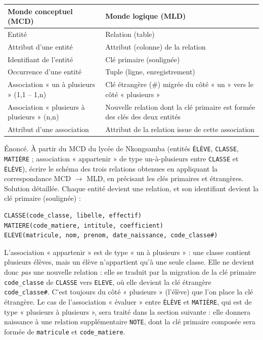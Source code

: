 \documentclass[11pt]{article}
\begin{document}
\begin{center}
\begin{tabularx}{\linewidth}{|X|X|}
\hline
\rowcolor{popblueL} \textbf{Monde conceptuel (MCD)} & \textbf{Monde logique (MLD)} \\
\hline
Entité & Relation (table) \\
\hline
Attribut d'une entité & Attribut (colonne) de la relation \\
\hline
Identifiant de l'entité & Clé primaire (soulignée) \\
\hline
Occurrence d'une entité & Tuple (ligne, enregistrement) \\
\hline
Association « un à plusieurs » (1,1 -- 1,n) & Clé étrangère (\#) migrée du côté « un » vers le côté « plusieurs » \\
\hline
Association « plusieurs à plusieurs » (n,n) & Nouvelle relation dont la clé primaire est formée des clés des deux entités \\
\hline
Attribut d'une association & Attribut de la relation issue de cette association \\
\hline
\end{tabularx}
\end{center}

\begin{exoresolu}
Énoncé. À partir du MCD du lycée de Nkongsamba (entités \texttt{ÉLÈVE}, \texttt{CLASSE}, \texttt{MATIÈRE} ; association « appartenir » de type un-à-plusieurs entre \texttt{CLASSE} et \texttt{ÉLÈVE}), écrire le schéma des trois relations obtenues en appliquant la correspondance MCD $\to$ MLD, en précisant les clés primaires et étrangères.
\tcblower
Solution détaillée. Chaque entité devient une relation, et son identifiant devient la clé primaire (soulignée) :
\begin{lstlisting}
CLASSE(code_classe, libelle, effectif)
MATIERE(code_matiere, intitule, coefficient)
ELEVE(matricule, nom, prenom, date_naissance, code_classe#)
\end{lstlisting}
L'association « appartenir » est de type « un à plusieurs » : une classe contient plusieurs élèves, mais un élève n'appartient qu'à une seule classe. Elle ne devient donc \emph{pas} une nouvelle relation : elle se traduit par la migration de la clé primaire \texttt{code\_classe} de \texttt{CLASSE} vers \texttt{ELEVE}, où elle devient la clé étrangère \texttt{code\_classe\#}. C'est toujours du côté « plusieurs » (l'élève) que l'on place la clé étrangère. Le cas de l'association « évaluer » entre \texttt{ÉLÈVE} et \texttt{MATIÈRE}, qui est de type « plusieurs à plusieurs », sera traité dans la section suivante : elle donnera naissance à une relation supplémentaire \texttt{NOTE}, dont la clé primaire composée sera formée de \texttt{matricule} et \texttt{code\_matiere}.
\end{exoresolu}
\end{document}

